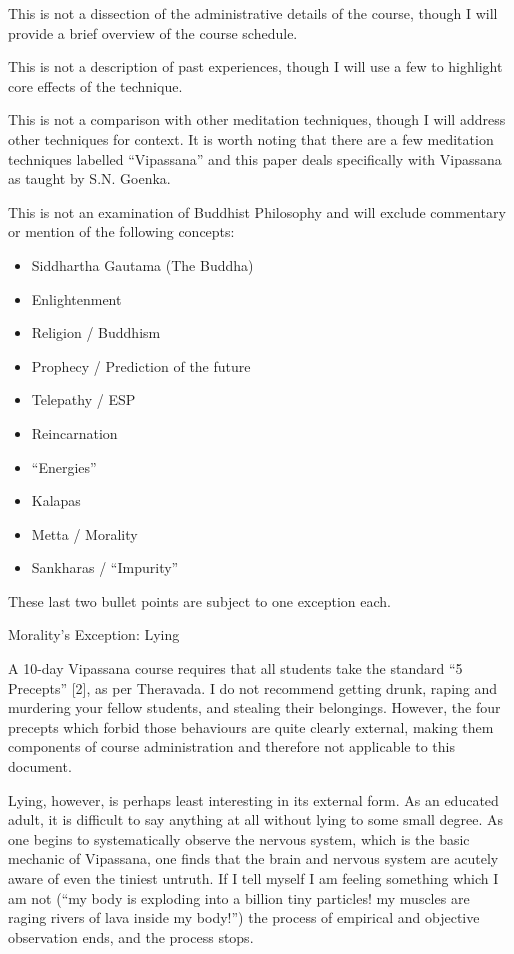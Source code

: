 \documentclass{article}
\begin{document}
This is not a dissection of the administrative details of the course, though I will provide a brief overview of the course schedule.

This is not a description of past experiences, though I will use a few to highlight core effects of the technique.

This is not a comparison with other meditation techniques, though I will address other techniques for context. It is worth noting that there are a few meditation techniques labelled “Vipassana” and this paper deals specifically with Vipassana as taught by S.N. Goenka.

This is not an examination of Buddhist Philosophy and will exclude commentary or mention of the following concepts:

\begin{itemize}
  \item Siddhartha Gautama (The Buddha)
  \item Enlightenment
  \item Religion / Buddhism
  \item Prophecy / Prediction of the future
  \item Telepathy / ESP
  \item Reincarnation
  \item ``Energies''
  \item Kalapas
  \item Metta / Morality
  \item Sankharas / ``Impurity''
\end{itemize}

These last two bullet points are subject to one exception each.

\pagebreak

\begin{center}
  \LARGE{Morality's Exception: Lying}
\end{center}

A 10-day Vipassana course requires that all students take the standard ``5 Precepts'' [2], as per Theravada. I do not recommend getting drunk, raping and murdering your fellow students, and stealing their belongings. However, the four precepts which forbid those behaviours are quite clearly external, making them components of course administration and therefore not applicable to this document.

Lying, however, is perhaps least interesting in its external form. As an educated adult, it is difficult to say anything at all without lying to some small degree. As one begins to systematically observe the nervous system, which is the basic mechanic of Vipassana, one finds that the brain and nervous system are acutely aware of even the tiniest untruth. If I tell myself I am feeling something which I am not (``my body is exploding into a billion tiny particles! my muscles are raging rivers of lava inside my body!'') the process of empirical and objective observation ends, and the process stops.
\end{document}
